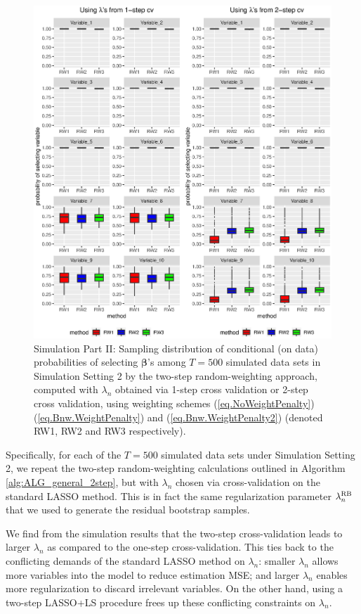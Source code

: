 \documentclass[ejs,authoryear,linksfromyear]{imsart}
\numberwithin{equation}{section}
\theoremstyle{plain}
\begin{document}
\begin{figure}[!]
	\centering
	\includegraphics[scale=0.6]{simul2_prob_select}
	\caption{Simulation Part II: Sampling distribution of conditional (on data) probabilities of selecting $\bm{\beta}$'s among $T = 500$ simulated data sets in Simulation Setting 2 by the two-step random-weighting approach, computed with $\lambda_n$ obtained via 1-step cross validation or 2-step cross validation, using weighting schemes (\ref{eq.NoWeightPenalty}) (\ref{eq.Bnw.WeightPenalty}) and (\ref{eq.Bnw.WeightPenalty2}) (denoted RW1, RW2 and RW3 respectively).}
	\label{fig:simul2_prob_select}
\end{figure}  

Specifically, for each of the $T=500$ simulated data sets under Simulation Setting 2, we repeat the two-step random-weighting calculations outlined in Algorithm \ref{alg:ALG_general_2step}, but with $\lambda_n$ chosen via cross-validation on the standard LASSO method. This is in fact the same regularization parameter $\lambda_n^{\rm RB}$ that we used to generate the residual bootstrap samples. 

We find from the simulation results that the two-step cross-validation leads to larger $\lambda_n$ as compared to the one-step cross-validation. This ties back to the conflicting demands of the standard LASSO method on $\lambda_n$: smaller $\lambda_n$ allows more variables into the model to reduce estimation MSE; and larger $\lambda_n$ enables more regularization to discard irrelevant variables. On the other hand, using a two-step LASSO+LS procedure frees up these conflicting constraints on $\lambda_n$. 
\end{document}
